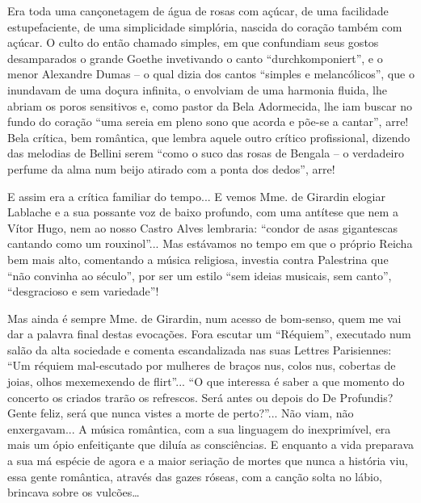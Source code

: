 Era toda uma cançonetagem de água de rosas com açúcar, de uma facilidade
estupefaciente, de uma simplicidade simplória, nascida do coração também
com açúcar. O culto do então chamado simples, em que confundiam seus
gostos desamparados o grande Goethe invetivando o canto
``durchkomponiert'', e o menor Alexandre Dumas -- o qual dizia dos
cantos ``simples e melancólicos'', que o inundavam de uma doçura
infinita, o envolviam de uma harmonia fluida, lhe abriam os poros
sensitivos e, como pastor da Bela Adormecida, lhe iam buscar no fundo do
coração ``uma sereia em pleno sono que acorda e põe-se a cantar'', arre!
Bela crítica, bem romântica, que lembra aquele outro crítico
profissional, dizendo das melodias de Bellini serem ``como o suco das
rosas de Bengala -- o verdadeiro perfume da alma num beijo atirado com a
ponta dos dedos'', arre!

E assim era a crítica familiar do tempo... E vemos Mme. de Girardin
elogiar Lablache e a sua possante voz de baixo profundo, com uma
antítese que nem a Vítor Hugo, nem ao nosso Castro Alves lembraria:
``condor de asas gigantescas cantando como um rouxinol''... Mas
estávamos no tempo em que o próprio Reicha bem mais alto, comentando a
música religiosa, investia contra Palestrina que ``não convinha ao
século'', por ser um estilo ``sem ideias musicais, sem canto'',
``desgracioso e sem variedade''!

Mas ainda é sempre Mme. de Girardin, num acesso de bom-senso, quem me
vai dar a palavra final destas evocações. Fora escutar um ``Réquiem'',
executado num salão da alta sociedade e comenta escandalizada nas suas
Lettres Parisiennes: ``Um réquiem mal-escutado por mulheres de braços
nus, colos nus, cobertas de joias, olhos mexemexendo de flirt''... ``O
que interessa é saber a que momento do concerto os criados trarão os
refrescos. Será antes ou depois do De Profundis? Gente feliz, será que
nunca vistes a morte de perto?''... Não viam, não enxergavam... A música
romântica, com a sua linguagem do inexprimível, era mais um ópio
enfeitiçante que diluía as consciências. E enquanto a vida preparava a
sua má espécie de agora e a maior seriação de mortes que nunca a
história viu, essa gente romântica, através das gazes róseas, com a
canção solta no lábio, brincava sobre os vulcões\ldots{}



